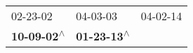 \begin{supertabular}{lll}
                  02-23-02\textsuperscript{} &                   04-03-03\textsuperscript{} &  04-02-14\textsuperscript{} \\
 \textbf{10-09-02\textsuperscript{$\wedge$}} &  \textbf{01-23-13\textsuperscript{$\wedge$}} &                             \\
\end{supertabular}

